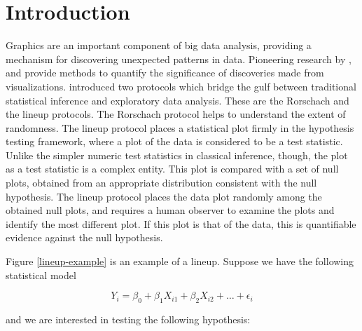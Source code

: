 \documentclass[12]{article}
\begin{document}

\section{Introduction} 
Graphics are an important component of big data analysis, providing a mechanism for discovering unexpected patterns in data. Pioneering research by \citet{gelman:2004}, \citet{buja:2009} and \cite{majumder:2011} provide methods to quantify the significance of discoveries made from visualizations. %
\cite{buja:2009} introduced two protocols which bridge the gulf between traditional statistical inference and exploratory data analysis. These are the Rorschach and the lineup protocols. The Rorschach protocol helps to understand the extent of randomness. The lineup protocol places a statistical plot firmly in the hypothesis testing framework, where a plot of the data is considered to be a test statistic. Unlike the simpler numeric test statistics in classical inference, though, the plot as a test statistic is a complex entity. This plot is compared with a set of null plots, obtained from an appropriate distribution consistent with the null hypothesis. The lineup protocol places the data plot randomly among the obtained null plots, and requires a human observer to examine the plots and identify the most different plot. If this plot is that of the data, this is quantifiable evidence against the null hypothesis. 

Figure \ref{lineup-example} is an example of a lineup. Suppose we have the following statistical model

$$Y_i = \beta_0 + \beta_1 X_{i1} + \beta_2 X_{i2} + \dots + \epsilon_i$$

\noindent and we are interested in testing the following hypothesis:
\end{document}
